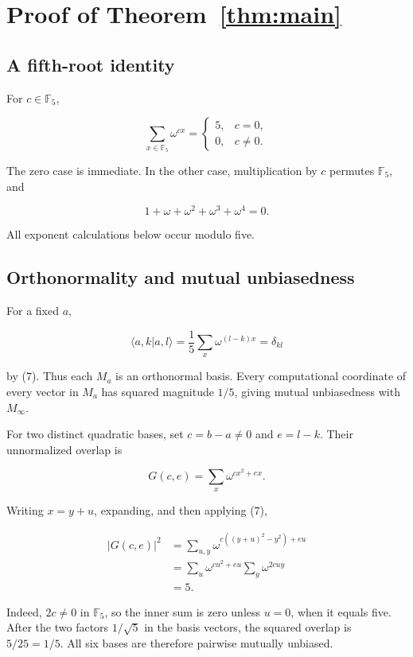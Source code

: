 \documentclass[11pt,a4paper]{article}
\begin{document}
\section{Proof of Theorem~\ref{thm:main}}

\subsection{A fifth-root identity}

For \(c\in\mathbb F_5\),

\[
 \sum_{x\in\mathbb F_5}\omega^{cx}=
 \begin{cases}5,&c=0,\\0,&c\ne0.\end{cases}
 \tag{7}
\]

The zero case is immediate. In the other case, multiplication by \(c\)
permutes \(\mathbb F_5\), and

\[
 1+\omega+\omega^2+\omega^3+\omega^4=0.
\]

All exponent calculations below occur modulo five.

\subsection{Orthonormality and mutual unbiasedness}

For a fixed \(a\),

\[
 \langle a,k|a,l\rangle
 =\frac15\sum_x\omega^{(l-k)x}
 =\delta_{kl}
\]

by (7). Thus each \(M_a\) is an orthonormal basis. Every computational
coordinate of every vector in \(M_a\) has squared magnitude \(1/5\),
giving mutual unbiasedness with \(M_\infty\).

For two distinct quadratic bases, set \(c=b-a\ne0\) and \(e=l-k\). Their
unnormalized overlap is

\[
 G(c,e)=\sum_x\omega^{cx^2+ex}.
\]

Writing \(x=y+u\), expanding, and then applying (7),

\[
\begin{aligned}
 |G(c,e)|^2
 &=\sum_{u,y}\omega^{c((y+u)^2-y^2)+eu}\\
 &=\sum_u\omega^{cu^2+eu}\sum_y\omega^{2cuy}\\
 &=5.
\end{aligned}
\]

Indeed, \(2c\ne0\) in \(\mathbb F_5\), so the inner sum is zero unless
\(u=0\), when it equals five. After the two factors \(1/\sqrt5\) in the
basis vectors, the squared overlap is \(5/25=1/5\). All six bases are
therefore pairwise mutually unbiased.
\end{document}
